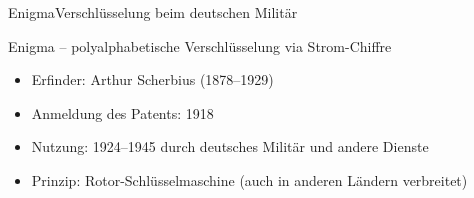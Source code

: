 \documentclass{beamer}
\theoremstyle{plain}
\begin{document}
 \begin{frame}{Enigma}{Verschlüsselung beim deutschen Militär}
 
  \begin{block}{Enigma -- polyalphabetische Verschlüsselung via Strom-Chiffre }
   \begin{itemize}
    \item Erfinder: Arthur Scherbius (1878--1929)
    \item Anmeldung des Patents: 1918
    \item Nutzung: 1924--1945 durch deutsches Militär und andere Dienste
    \item Prinzip: Rotor-Schlüsselmaschine (auch in anderen Ländern verbreitet)
   \end{itemize}

  \end{block}

 \end{frame}
\end{document}
